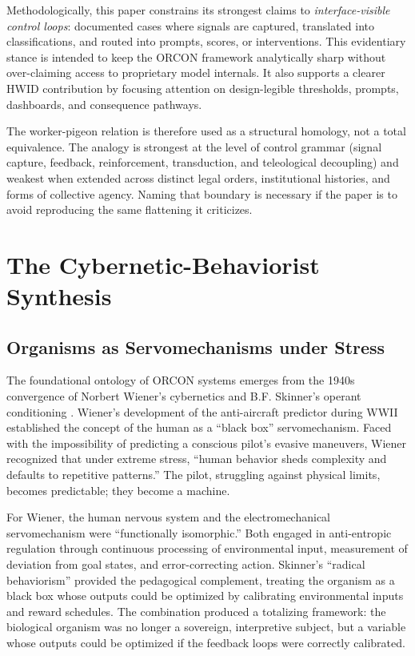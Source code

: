 \documentclass[11pt, a4paper]{article}
\begin{document}
Methodologically, this paper constrains its strongest claims to \textit{interface-visible control loops}: documented cases where signals are captured, translated into classifications, and routed into prompts, scores, or interventions. This evidentiary stance is intended to keep the ORCON framework analytically sharp without over-claiming access to proprietary model internals. It also supports a clearer HWID contribution by focusing attention on design-legible thresholds, prompts, dashboards, and consequence pathways.

The worker-pigeon relation is therefore used as a structural homology, not a total equivalence. The analogy is strongest at the level of control grammar (signal capture, feedback, reinforcement, transduction, and teleological decoupling) and weakest when extended across distinct legal orders, institutional histories, and forms of collective agency. Naming that boundary is necessary if the paper is to avoid reproducing the same flattening it criticizes.

\section{The Cybernetic-Behaviorist Synthesis}

\subsection{Organisms as Servomechanisms under Stress}
The foundational ontology of ORCON systems emerges from the 1940s convergence of Norbert Wiener's cybernetics \cite{wiener1948} and B.F. Skinner's operant conditioning \cite{skinner1938}. Wiener's development of the anti-aircraft predictor during WWII established the concept of the human as a ``black box'' servomechanism. Faced with the impossibility of predicting a conscious pilot's evasive maneuvers, Wiener recognized that under extreme stress, ``human behavior sheds complexity and defaults to repetitive patterns.'' The pilot, struggling against physical limits, becomes predictable; they become a machine.

For Wiener, the human nervous system and the electromechanical servomechanism were ``functionally isomorphic.'' Both engaged in anti-entropic regulation through continuous processing of environmental input, measurement of deviation from goal states, and error-correcting action. Skinner's ``radical behaviorism'' provided the pedagogical complement, treating the organism as a black box whose outputs could be optimized by calibrating environmental inputs and reward schedules. The combination produced a totalizing framework: the biological organism was no longer a sovereign, interpretive subject, but a variable whose outputs could be optimized if the feedback loops were correctly calibrated.
\end{document}
